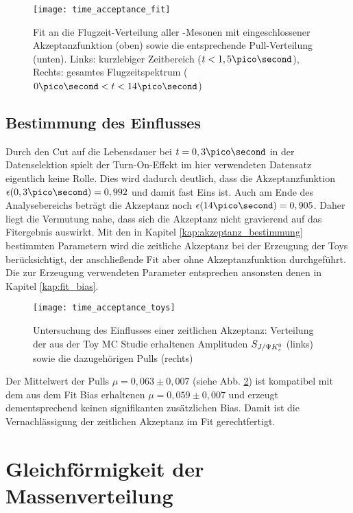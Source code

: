 \begin{figure}[hptb]
\centering
\texttt{[image: time\_acceptance\_fit]}
\caption{Fit an die Flugzeit-Verteilung aller \Bd-Mesonen mit eingeschlossener Akzeptanzfunktion (oben) sowie die entsprechende Pull-Verteilung (unten). Links: kurzlebiger Zeitbereich ($t<1,5\pico\second$), Rechts: gesamtes Flugzeitspektrum ($0\ps < t < 14\ps$)}
\label{fig:fit_akzeptanz}
\end{figure}

\subsection{Bestimmung des Einflusses}
Durch den Cut auf die Lebensdauer bei $t = 0,3\ps$ in der Datenselektion spielt der Turn-On-Effekt im hier verwendeten Datensatz eigentlich keine Rolle. Dies wird dadurch deutlich, dass die Akzeptanzfunktion $\epsilon(0,3\ps) = 0,992$ und damit fast Eins ist. Auch am Ende des Analysebereichs beträgt die Akzeptanz noch $\epsilon(14\ps) = 0,905$. Daher liegt die Vermutung nahe, dass sich die Akzeptanz nicht gravierend auf das Fitergebnis auswirkt. Mit den in Kapitel \ref{kap:akzeptanz_bestimmung} bestimmten Parametern wird die zeitliche Akzeptanz bei der Erzeugung der Toys berücksichtigt, der anschließende Fit aber ohne Akzeptanzfunktion durchgeführt. Die zur Erzeugung verwendeten Parameter entsprechen ansonsten denen in Kapitel \ref{kap:fit_bias}.

\begin{figure}[hptb]
\centering
\texttt{[image: time\_acceptance\_toys]}
\caption{Untersuchung des Einflusses einer zeitlichen Akzeptanz: Verteilung der aus der Toy MC Studie erhaltenen Amplituden $S_{J/\Psi K_s^0}$ (links) sowie die dazugehörigen Pulls (rechts)}
\label{fig:toys_acceptance}
\end{figure}

Der Mittelwert der Pulls $\mu = 0,063 \pm 0,007$ (siehe Abb. \ref{fig:toys_acceptance}) ist kompatibel mit dem aus dem Fit Bias erhaltenen $\mu = 0,059 \pm 0,007$ und erzeugt dementsprechend keinen signifikanten zusätzlichen Bias. Damit ist die Vernachlässigung der zeitlichen Akzeptanz im Fit gerechtfertigt.



\section{Gleichförmigkeit der Massenverteilung}
